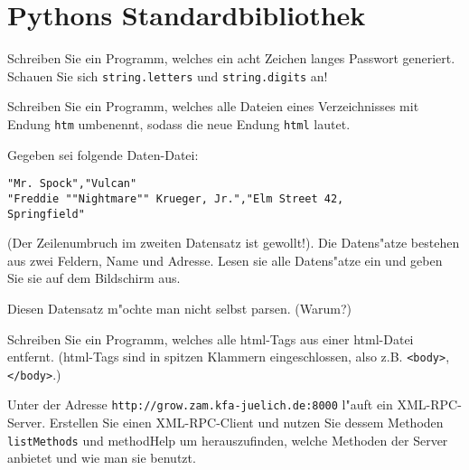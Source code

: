 \section*{Pythons Standardbibliothek}

\begin{aufgabe}
Schreiben Sie ein Programm, welches ein acht Zeichen langes Passwort generiert. \hinweis Schauen Sie sich \lstinline{string.letters} und \lstinline{string.digits} an!
\end{aufgabe}

\begin{aufgabe}
Schreiben Sie ein Programm, welches alle Dateien eines Verzeichnisses mit Endung \texttt{htm} umbenennt, sodass die neue Endung \texttt{html} lautet.
\end{aufgabe}

\begin{aufgabe}[CSV]
Gegeben sei folgende Daten-Datei:
\begin{verbatim}
"Mr. Spock","Vulcan"
"Freddie ""Nightmare"" Krueger, Jr.","Elm Street 42,
Springfield" 
\end{verbatim}
(Der Zeilenumbruch im zweiten Datensatz ist gewollt!). Die Datens"atze bestehen aus zwei Feldern, Name und Adresse. Lesen sie alle Datens"atze ein und geben Sie sie auf dem Bildschirm aus.

\hinweis Diesen Datensatz m"ochte man nicht selbst parsen. (Warum?)
\end{aufgabe}

\begin{aufgabe}
Schreiben Sie ein Programm, welches alle html-Tags aus einer html-Datei entfernt. (html-Tags sind in spitzen Klammern eingeschlossen, also z.B. \texttt{<body>}, \texttt{</body>}.)
\end{aufgabe}

\begin{aufgabe}
Unter der Adresse \lstinline{http://grow.zam.kfa-juelich.de:8000} l"auft ein XML-RPC-Server. Erstellen Sie einen XML-RPC-Client und nutzen Sie dessem Methoden \lstinline{listMethods} und {methodHelp} um herauszufinden, welche Methoden der Server anbietet und wie man sie benutzt.
\end{aufgabe}



